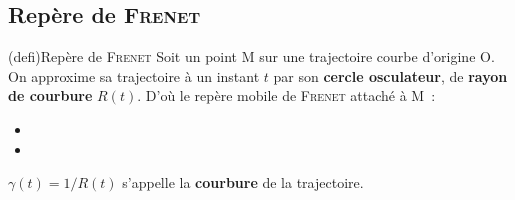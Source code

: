 \documentclass[../../main/main.tex]{subfiles}
\begin{document}
\vspace*{-20pt}

\subsection{Repère de \textsc{Frenet}}

\begin{tcb*}[sidebyside, righthand ratio=.4](defi){Repère de \textsc{Frenet}}
	Soit un point M sur une trajectoire courbe d'origine O. On approxime sa
	trajectoire à un instant $t$ par son \textbf{cercle osculateur}, de
	\textbf{rayon de courbure} $R(t)$. D'où le repère mobile de \textsc{Frenet}
	attaché à M~:
	\begin{itemize}
		\item {}
		\item {}%
	\end{itemize}
	$\gamma(t) = 1/R(t)$ s'appelle la \textbf{courbure} de
	la trajectoire.
	\tcblower
	\begin{center}
		\vspace{-15pt}
	\end{center}
\end{tcb*}
\end{document}
